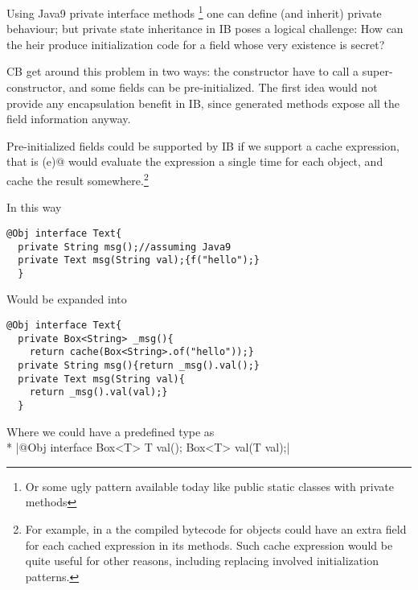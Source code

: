 Using Java9 private interface methods%
\footnote{Or some ugly pattern available today like public static classes with private methods}
one can define (and inherit) private behaviour; but private state inheritance in IB poses a logical challenge:
How can the heir produce initialization code for a field whose very existence is secret?

CB get around this problem in two ways: the constructor have to call a super-constructor, and
some fields can be pre-initialized.
The first idea would not provide any encapsulation benefit in IB,
since generated \Q@of@ methods expose all the field information anyway.

Pre-initialized fields could be supported by IB if we support a cache expression,
that is \Q@cache(e)@ would evaluate the expression a single time for each object, and cache the result
somewhere.\footnote{
For example, in a the compiled bytecode for objects
could have an extra field for each cached expression in its methods.
Such cache expression would be quite useful for other reasons,
including replacing involved initialization patterns.}

In this way
\begin{lstlisting}
@Obj interface Text{
  private String msg();//assuming Java9
  private Text msg(String val);{f("hello");}
  }
\end{lstlisting}
Would be expanded into
\begin{lstlisting}
@Obj interface Text{
  private Box<String> _msg(){
    return cache(Box<String>.of("hello"));}
  private String msg(){return _msg().val();}
  private Text msg(String val){
    return _msg().val(val);}
  }
\end{lstlisting}

Where we could have a predefined \Q@Box@ type as\\*
\Q|@Obj interface Box<T>{ T val(); Box<T> val(T val);}|




